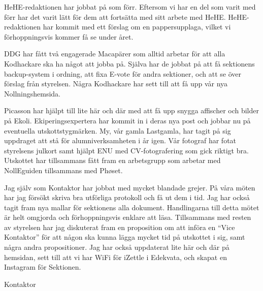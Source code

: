 \documentclass[../_main/handlingar.tex]{subfiles}
\begin{document}

HeHE-redaktionen har jobbat på som förr. Eftersom vi har en del som varit med förr har det varit lätt för dem att fortsätta med sitt arbete med HeHE. HeHE-redaktionen har kommit med ett förslag om en pappersupplaga, vilket vi förhoppningsvis kommer få se under året.

DDG har fått två engagerade Macapärer som alltid arbetar för att alla Kodhackare ska ha något att jobba på. Själva har de jobbat på att få sektionens backup-system i ordning, att fixa E-vote för andra sektioner, och att se över förslag från styrelsen. Några Kodhackare har sett till att få upp vår nya Nollningshemsida.

Picasson har hjälpt till lite här och där med att få upp snygga affischer och bilder på Ekoli. Ekiperingsexpertera har kommit in i deras nya post och jobbar nu på eventuella utskottstygmärken. My, vår gamla Lastgamla, har tagit på sig uppdraget att stå för alumniverksamheten i år igen. Vår fotograf har fotat styrelsens julkort samt hjälpt ENU med CV-fotografering som gick riktigt bra. Utskottet har tillsammans fått fram en arbetsgrupp som arbetar med NollEguiden tillsammans med Phøset.

Jag själv som Kontaktor har jobbat med mycket blandade grejer. På våra möten har jag försökt skriva bra utförliga protokoll och få ut dem i tid. Jag har också tagit fram nya mallar för sektionens alla dokument. Handlingarna till detta mötet är helt omgjorda och förhoppningsvis enklare att läsa. Tillsammans med resten av styrelsen har jag diskuterat fram en proposition om att införa en ``Vice Kontaktor'' för att någon ska kunna lägga mycket tid på utskottet i sig, samt några andra propositioner. Jag har också uppdaterat lite här och där på hemsidan, sett till att vi har WiFi för iZettle i Edekvata, och skapat en Instagram för Sektionen.

\begin{signatures}{1}
    \mvh
    \signature{Erik Månsson}{Kontaktor}
\end{signatures}
\end{document}
